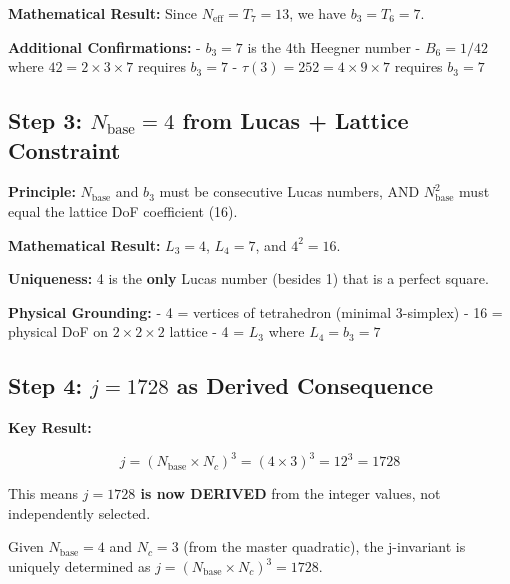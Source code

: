 \documentclass[
  11pt,
  letterpaper,
  twoside,
  openright]{book}
\begin{document}
\textbf{Mathematical Result:} Since \(N_{\text{eff}} = T_7 = 13\), we
have \(b_3 = T_6 = 7\).

\textbf{Additional Confirmations:} - \(b_3 = 7\) is the 4th Heegner
number - \(B_6 = 1/42\) where \(42 = 2 \times 3 \times 7\) requires
\(b_3 = 7\) - \(\tau(3) = 252 = 4 \times 9 \times 7\) requires
\(b_3 = 7\)

\subsection{\texorpdfstring{Step 3: \(N_{\text{base}} = 4\) from Lucas +
Lattice
Constraint}{Step 3: N\_\{\textbackslash text\{base\}\} = 4 from Lucas + Lattice Constraint}}\label{step-3-n_textbase-4-from-lucas-lattice-constraint}

\textbf{Principle:} \(N_{\text{base}}\) and \(b_3\) must be consecutive
Lucas numbers, AND \(N_{\text{base}}^2\) must equal the lattice DoF
coefficient (16).

\textbf{Mathematical Result:} \(L_3 = 4\), \(L_4 = 7\), and
\(4^2 = 16\).

\textbf{Uniqueness:} 4 is the \textbf{only} Lucas number (besides 1)
that is a perfect square.

\textbf{Physical Grounding:} - 4 = vertices of tetrahedron (minimal
3-simplex) - 16 = physical DoF on \(2 \times 2 \times 2\) lattice - 4 =
\(L_3\) where \(L_4 = b_3 = 7\)

\subsection{\texorpdfstring{Step 4: \(j = 1728\) as Derived
Consequence}{Step 4: j = 1728 as Derived Consequence}}\label{step-4-j-1728-as-derived-consequence}

\textbf{Key Result:}

\[\boxed{j = (N_{\text{base}} \times N_c)^3 = (4 \times 3)^3 = 12^3 = 1728}\]

This means \textbf{\(j = 1728\) is now DERIVED} from the integer values,
not independently selected.

\begin{tcolorbox}[enhanced jigsaw, coltitle=black, colbacktitle=quarto-callout-important-color!10!white, toprule=.15mm, colframe=quarto-callout-important-color-frame, arc=.35mm, opacityback=0, bottomtitle=1mm, toptitle=1mm, breakable, colback=white, titlerule=0mm, opacitybacktitle=0.6, title=\textcolor{quarto-callout-important-color}{\faExclamation}\hspace{0.5em}{Theorem NTHR-1}, rightrule=.15mm, bottomrule=.15mm, leftrule=.75mm, left=2mm]

Given \(N_{\text{base}} = 4\) and \(N_c = 3\) (from the master
quadratic), the j-invariant is uniquely determined as
\(j = (N_{\text{base}} \times N_c)^3 = 1728\).

\end{tcolorbox}
\end{document}
